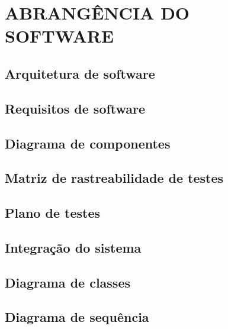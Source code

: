 \chapter{ABRANGÊNCIA DO SOFTWARE}
\label{chap:abrsw}

\section{Arquitetura de software}
\label{sec:arqsw}

\section{Requisitos de software}
\label{sec:reqsw}

\section{Diagrama de componentes}
\label{sec:diagcomp}

\section{Matriz de rastreabilidade de testes}
\label{sec:matrtest}

\section{Plano de testes}
\label{sec:plantest}

\section{Integração do sistema}
\label{sec:intsist}

\section{Diagrama de classes}
\label{sec:diagclas}

\section{Diagrama de sequência}
\label{sec:diagseq}


